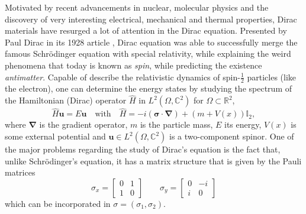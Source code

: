 Motivated by recent advancements in nuclear, molecular physics and the discovery of very interesting electrical, mechanical and thermal properties, Dirac materials have resurged a lot of attention in the Dirac equation. Presented by Paul Dirac in its 1928 article \cite{dirac1928quantum}, Dirac equation was able to successfully merge the famous Schr\"{o}dinger equation with special relativity, while explaining the weird phenomena that today is known as \textit{spin}, while predicting the existence \textit{antimatter}.
Capable of describe the relativistic dynamics of spin-$\frac{1}{2}$ particles (like the electron), one can determine the energy states by studying the spectrum of the Hamiltonian (Dirac) operator \(\hat{H}\) in \(L^2(\Omega, \mathbb{C}^2)\) for \(\Omega \subset \mathbb{R}^2\),
\begin{equation}\label{dirac_eq}
    \hat{H} \mathbf{u} = E \mathbf{u} \quad \text{with} \quad \hat{H}= -i (\mathbf{\sigma} \cdot \mathbf{\nabla}) + \left(m + V(x)\right) \mathbb{I}_2,
\end{equation}
where \(\mathbf{\nabla}\) is the gradient operator, \(m\) is the particle mass, \(E\) its energy, \(V(x)\) is some external potential and \(\mathbf{u} \in L^2(\Omega, \mathbb{C}^2)\) is a two-component spinor. One of the major problems regarding the study of Dirac's equation is the fact that, unlike Schr\"{o}dinger's equation, it has a matrix structure that is given by the Pauli matrices
\[
\sigma_x = \begin{bmatrix}
    0 & 1\\
    1 & 0
\end{bmatrix} \qquad \sigma_y = \begin{bmatrix}
    0 & -i\\
    i & 0
\end{bmatrix}
\]
which can be incorporated in \(\sigma = (\sigma_1, \sigma_2)\).    

